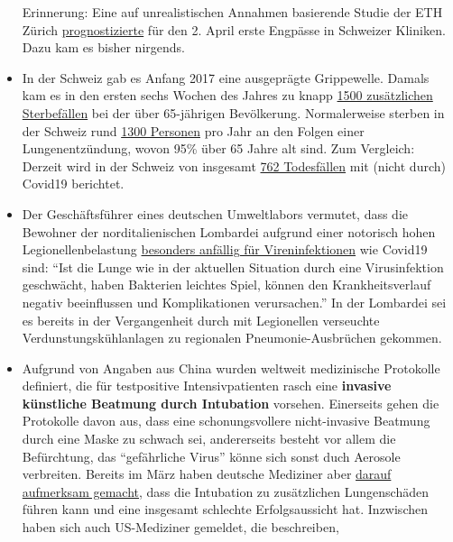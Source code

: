 \begin{itemize}
  Erinnerung: Eine auf unrealistischen Annahmen basierende Studie der
  ETH Zürich
  \href{https://www.toponline.ch/news/coronavirus/detail/news/studie-bestaetigt-engpass-bei-spitalbetten-steht-kurz-bevor-00131333/}{prog­nos­tizierte}
  für den 2. April erste Engpässe in Schweizer Kliniken. Dazu kam es
  bisher nirgends.
\item
  In der Schweiz gab es Anfang 2017 eine ausgeprägte Grippewelle. Damals
  kam es in den ersten sechs Wochen des Jahres zu knapp
  \href{https://www.srf.ch/news/schweiz/todesursachen-statistik-woran-die-meisten-schweizerinnen-und-schweizer-sterben}{1500
  zusätzlichen Sterbefällen} bei der über 65-jährigen Bevölkerung.
  Normalerweise sterben in der Schweiz rund
  \href{https://www.nzz.ch/lungenentzuendung-1.4550285}{1300 Personen}
  pro Jahr an den Folgen einer Lungenentzündung, wovon 95\% über 65
  Jahre alt sind. Zum Vergleich: Derzeit wird in der Schweiz von
  insgesamt \href{https://www.corona-data.ch/}{762 Todesfällen} mit
  (nicht durch) Covid19 berichtet.
\item
  Der Geschäftsführer eines deutschen Umweltlabors vermutet, dass die
  Bewohner der norditalienischen Lombardei aufgrund einer notorisch
  hohen Legionellenbelastung
  \href{https://m.apotheke-adhoc.de/nachrichten/detail/coronavirus/erhoehen-legionellen-die-todesrate-einer-corona-infektion/}{besonders
  anfällig für Vireninfektionen} wie Covid19 sind: ``Ist die Lunge wie
  in der aktuellen Situation durch eine Virusinfektion geschwächt, haben
  Bakterien leichtes Spiel, können den Krankheitsverlauf negativ
  beeinflussen und Komplikationen verursachen.'' In der Lombardei sei es
  bereits in der Vergangenheit durch mit Legionellen verseuchte
  Verdunstungs­kühlanlagen zu regionalen Pneumonie-Ausbrüchen gekommen.
\item
  Aufgrund von Angaben aus China wurden weltweit medizinische Protokolle
  definiert, die für testpositive Intensivpatienten rasch eine
  \textbf{invasive künstliche Beatmung durch Intubation} vorsehen.
  Einerseits gehen die Protokolle davon aus, dass eine schonungs­vollere
  nicht-invasive Beatmung durch eine Maske zu schwach sei, andererseits
  besteht vor allem die Befürchtung, das ``gefährliche Virus'' könne
  sich sonst duch Aerosole verbreiten. Bereits im März haben deutsche
  Mediziner aber
  \href{https://www.doccheck.com/de/detail/articles/26271-covid-19-beatmung-und-dann}{darauf
  aufmerksam gemacht}, dass die Intubation zu zusätzlichen Lungenschäden
  führen kann und eine insgesamt schlechte Erfolgsaussicht hat.
  Inzwischen haben sich auch US-Mediziner gemeldet, die beschreiben,

\end{itemize}

